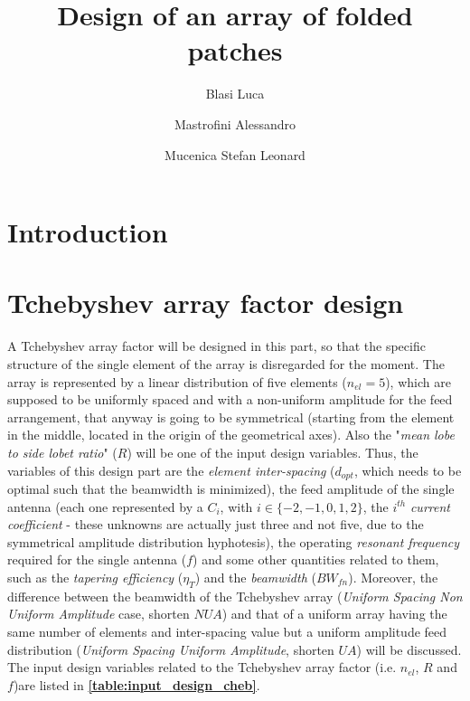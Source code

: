 \documentclass[12pt,a4paper,twocolumn]{article}
\title{\vspace*{20 pt}\fontfamily{qag}\selectfont\color{Turquoise}\huge\textbf{Design of an array of folded patches}\vspace*{10 pt}}
\author[1]{Blasi Luca}
\author[2]{Mastrofini Alessandro}
\author[3]{Mucenica Stefan Leonard}
\affil[2]{email}
\affil[3]{email}
\date{}
\begin{document}
	{\selectfont







\twocolumn[{
\begin{@twocolumnfalse} 
		\vspace*{10 pt}
	\begingroup
	\let\center\flushleft
	\maketitle

	\let\endcenter\endflushleft
	
	\endgroup
		\vspace*{5 pt}
		
		
	\begin{abstract}
	\textcolor{blue}{\lipsum[1-2]}
	\end{abstract}
	\vspace*{20 pt}
\end{@twocolumnfalse}
}
]




\section*{Introduction}
	\textcolor{blue}{\lipsum[1]}
\section*{Tchebyshev array factor design}

\indent A Tchebyshev array factor will be designed in this part, so that the specific structure of the single element of the array is disregarded for the moment. The array is represented by a linear distribution of five elements ($n_{el}=5$), which are supposed to be uniformly spaced and with a non-uniform amplitude for the feed arrangement, that anyway is going to be symmetrical (starting from the element in the middle, located in the origin of the geometrical axes). Also the "\emph{mean lobe to side lobet ratio}" ($R$) will be one of the input design variables. Thus, the variables of this design part are the \emph{element inter-spacing} ($d_{opt}$, which needs to be optimal such that the beamwidth is minimized), the feed amplitude of the single antenna (each one represented by a $C_i$, with $i\in\{-2,-1,0,1,2\}$, the $i^{th}$ \emph{current coefficient} - these unknowns are actually just three and not five, due to the symmetrical amplitude distribution hyphotesis), the operating \emph{resonant frequency} required for the single antenna ($f$) and some other quantities related to them, such as the \emph{tapering efficiency} ($\eta_T$) and the \emph{beamwidth} ($BW_{fn}$). Moreover, the difference between the beamwidth of the Tchebyshev array (\emph{Uniform Spacing Non Uniform Amplitude} case, shorten $NUA$) and  that of a uniform array having the same number of elements and inter-spacing value but a uniform amplitude feed distribution  (\emph{Uniform Spacing Uniform Amplitude}, shorten $UA$) will be discussed. The input design variables related to the Tchebyshev array factor (i.e. $n_{el}$, $R$ and $f$)are listed in \textbf{\cref{table:input_design_cheb}}. 

}
\end{document}
